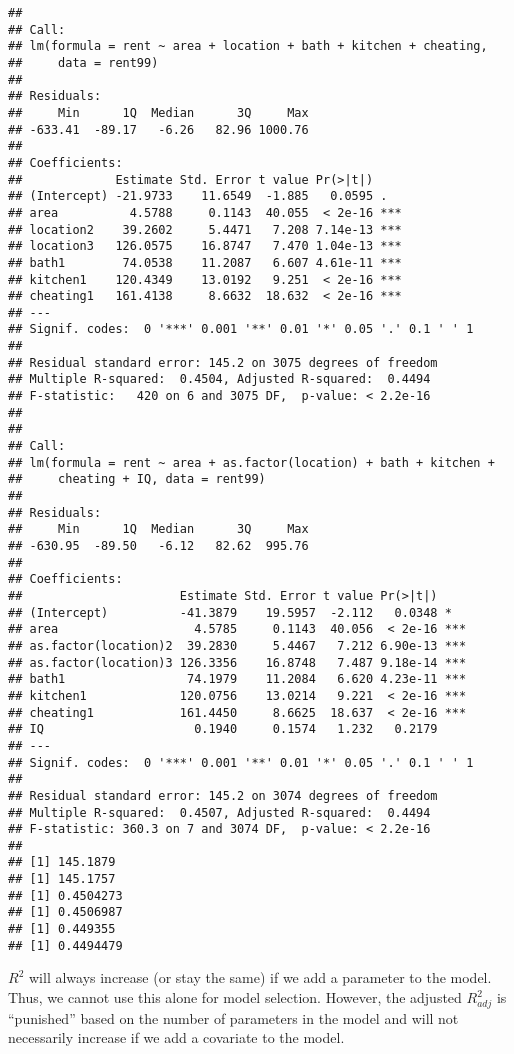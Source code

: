 \documentclass[]{article}
\begin{document}
\begin{verbatim}
## 
## Call:
## lm(formula = rent ~ area + location + bath + kitchen + cheating, 
##     data = rent99)
## 
## Residuals:
##     Min      1Q  Median      3Q     Max 
## -633.41  -89.17   -6.26   82.96 1000.76 
## 
## Coefficients:
##             Estimate Std. Error t value Pr(>|t|)    
## (Intercept) -21.9733    11.6549  -1.885   0.0595 .  
## area          4.5788     0.1143  40.055  < 2e-16 ***
## location2    39.2602     5.4471   7.208 7.14e-13 ***
## location3   126.0575    16.8747   7.470 1.04e-13 ***
## bath1        74.0538    11.2087   6.607 4.61e-11 ***
## kitchen1    120.4349    13.0192   9.251  < 2e-16 ***
## cheating1   161.4138     8.6632  18.632  < 2e-16 ***
## ---
## Signif. codes:  0 '***' 0.001 '**' 0.01 '*' 0.05 '.' 0.1 ' ' 1
## 
## Residual standard error: 145.2 on 3075 degrees of freedom
## Multiple R-squared:  0.4504, Adjusted R-squared:  0.4494 
## F-statistic:   420 on 6 and 3075 DF,  p-value: < 2.2e-16
## 
## 
## Call:
## lm(formula = rent ~ area + as.factor(location) + bath + kitchen + 
##     cheating + IQ, data = rent99)
## 
## Residuals:
##     Min      1Q  Median      3Q     Max 
## -630.95  -89.50   -6.12   82.62  995.76 
## 
## Coefficients:
##                      Estimate Std. Error t value Pr(>|t|)    
## (Intercept)          -41.3879    19.5957  -2.112   0.0348 *  
## area                   4.5785     0.1143  40.056  < 2e-16 ***
## as.factor(location)2  39.2830     5.4467   7.212 6.90e-13 ***
## as.factor(location)3 126.3356    16.8748   7.487 9.18e-14 ***
## bath1                 74.1979    11.2084   6.620 4.23e-11 ***
## kitchen1             120.0756    13.0214   9.221  < 2e-16 ***
## cheating1            161.4450     8.6625  18.637  < 2e-16 ***
## IQ                     0.1940     0.1574   1.232   0.2179    
## ---
## Signif. codes:  0 '***' 0.001 '**' 0.01 '*' 0.05 '.' 0.1 ' ' 1
## 
## Residual standard error: 145.2 on 3074 degrees of freedom
## Multiple R-squared:  0.4507, Adjusted R-squared:  0.4494 
## F-statistic: 360.3 on 7 and 3074 DF,  p-value: < 2.2e-16
## 
## [1] 145.1879
## [1] 145.1757
## [1] 0.4504273
## [1] 0.4506987
## [1] 0.449355
## [1] 0.4494479
\end{verbatim}

\(R^2\) will always increase (or stay the same) if we add a parameter to
the model. Thus, we cannot use this alone for model selection. However,
the adjusted \(R_{adj}^2\) is ``punished'' based on the number of
parameters in the model and will not necessarily increase if we add a
covariate to the model.
\end{document}

